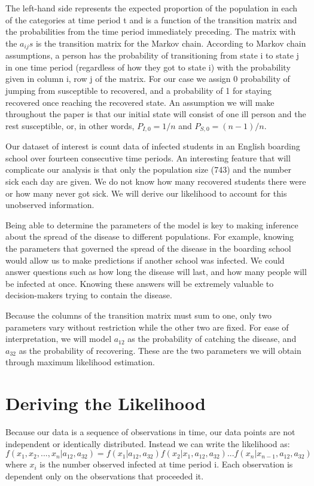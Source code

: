 \documentclass{svproc}
\begin{document}
The left-hand side represents the expected proportion of the population in each of the categories at time period t and is a function of the transition matrix and the probabilities from the time period immediately preceding. The matrix with the $a_{ij}s$ is the transition matrix for the Markov chain. According to Markov chain assumptions, a person has the probability of transitioning from state i to state j in one time period (regardless of how they got to state i) with the probability given in column i, row j of the matrix. For our case we assign 0 probability of jumping from susceptible to recovered, and a probability of 1 for staying recovered once reaching the recovered state. An assumption we will make throughout the paper is that our initial state will consist of one ill person and the rest susceptible, or, in other words, $P_{I,0}=1/n$ and $P_{S, 0} = (n-1)/n$.

Our dataset of interest is count data of infected students in an English boarding school over fourteen consecutive time periods. An interesting feature that will complicate our analysis is that only the population size (743) and the number sick each day are given. We do not know how many recovered students there were or how many never got sick. We will derive our likelihood to account for this unobserved information. 

Being able to determine the parameters of the model is key to making inference about the spread of the disease to different populations. For example, knowing the parameters that governed the spread of the disease in the boarding school would allow us to make predictions if another school was infected. We could answer questions such as how long the disease will last, and how many people will be infected at once. Knowing these answers will be extremely valuable to decision-makers trying to contain the disease.

Because the columns of the transition matrix must sum to one, only two parameters vary without restriction while the other two are fixed. For ease of interpretation, we will model $a_{12}$ as the probability of catching the disease, and $a_{32}$ as the probability of recovering. These are the two parameters we will obtain through maximum likelihood estimation. 

\section{Deriving the Likelihood}
Because our data is a sequence of observations in time, our data points are not independent or identically distributed. Instead we can write the likelihood as:
\begin{equation}
f(x_1, x_2,...,x_n| a_{12}, a_{32}) = f(x_1| a_{12}, a_{32}) f(x_2|x_1, a_{12}, a_{32}) ... f(x_n|x_{n-1}, a_{12}, a_{32})
\end{equation}
where $x_i$ is the number observed infected at time period i. Each observation is dependent only on the observations that proceeded it.
\end{document}
